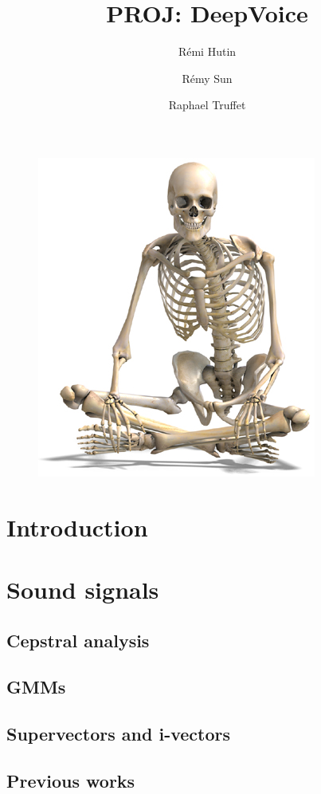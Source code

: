 \documentclass[a4paper,french,11pt]{article}
\title{PROJ: DeepVoice}
\author{Rémi Hutin \and Rémy Sun \and Raphael Truffet}
\begin{document}
\maketitle


\begin{figure}[!h]
    \centering
    \includegraphics[scale=2]{squelette.jpg}
\end{figure}

\section{Introduction}

\section{Sound signals}

\subsection{Cepstral analysis}

\subsection{GMMs}

\subsection{Supervectors and i-vectors}

\subsection{Previous works}
\end{document}
